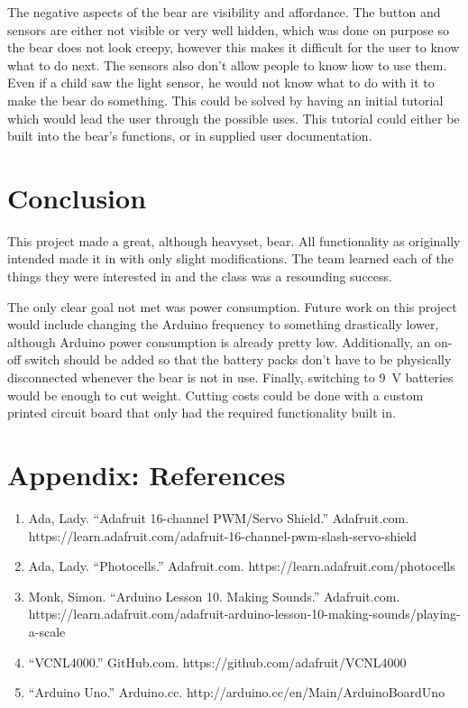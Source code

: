 \documentclass{article}
\begin{document}
The negative aspects of the bear are visibility and affordance. The button and sensors are either not visible or very well hidden, which was done on purpose so the bear does not look creepy, however this makes it difficult for the user to know what to do next. The sensors also don't allow people to know how to use them. Even if a child saw the light sensor, he would not know what to do with it to make the bear do something. This could be solved by having an initial tutorial which would lead the user through the possible uses. This tutorial could either be built into the bear's functions, or in supplied user documentation.

\section{Conclusion}
This project made a great, although heavyset, bear. All functionality as originally intended made it in with only slight modifications. The team learned each of the things they were interested in and the class was a resounding success.

The only clear goal not met was power consumption. Future work on this project would include changing the Arduino frequency to something drastically lower, although Arduino power consumption is already pretty low. Additionally, an on-off switch should be added so that the battery packs don't have to be physically disconnected whenever the bear is not in use. Finally, switching to 9~V batteries would be enough to cut weight. Cutting costs could be done with a custom printed circuit board that only had the required functionality built in.

\clearpage
\section*{Appendix: References}
\begin{enumerate}
    \item Ada, Lady. ``Adafruit 16-channel PWM/Servo Shield.'' Adafruit.com. https://learn.adafruit.com/adafruit-16-channel-pwm-slash-servo-shield
    \item Ada, Lady. ``Photocells.'' Adafruit.com. https://learn.adafruit.com/photocells
    \item Monk, Simon. ``Arduino Lesson 10. Making Sounds.'' Adafruit.com. https://learn.adafruit.com/adafruit-arduino-lesson-10-making-sounds/playing-a-scale
    \item ``VCNL4000.'' GitHub.com. https://github.com/adafruit/VCNL4000
    \item ``Arduino Uno.'' Arduino.cc. http://arduino.cc/en/Main/ArduinoBoardUno
\end{enumerate}
\end{document}
